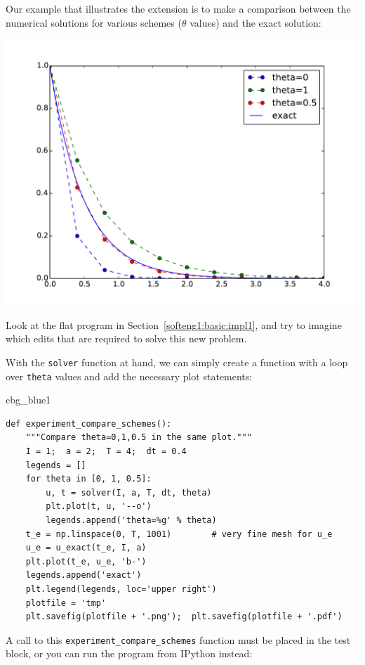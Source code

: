 \documentclass[%
oneside,                 %
final,                   %
10pt]{article}
\newenvironment{_cod_tight}[1]{
   \def\FrameCommand{\colorbox{#1}}
   \FrameRule0.6pt\MakeFramed {\FrameRestore}\vskip3mm}
   {\vskip0mm\endMakeFramed}
\newenvironment{cod}[1]{
\bgroup\rmfamily
\fboxsep=0mm\relax
\begin{_cod_tight}{#1}
\list{}{\parsep=-2mm\parskip=0mm\topsep=0pt\leftmargin=2mm
\rightmargin=2\leftmargin\leftmargin=4pt\relax}
\item\relax}
{\endlist\end{_cod_tight}\egroup}
\newenvironment{question_mdfboxadmon}[1][]{
\begin{question_mdfboxmdframed}[frametitle=#1]
}
{
\end{question_mdfboxmdframed}
}
\begin{document}
Our example that illustrates the extension
is to make a comparison between the numerical solutions
for various schemes ($\theta$ values) and the exact solution:



\centerline{\includegraphics[width=0.7\linewidth]{fig-softeng/compare.pdf}}




\begin{question_mdfboxadmon}
Look at the flat program in
Section~\ref{softeng1:basic:impl1},
and try to imagine which edits that are required to solve this new problem.
\end{question_mdfboxadmon}



With the \texttt{solver} function at hand, we can simply create a function
with a loop over \texttt{theta} values and add the necessary plot statements:

\begin{cod}{cbg_blue1}\begin{Verbatim}[numbers=none,fontsize=\fontsize{9pt}{9pt},baselinestretch=0.95,xleftmargin=2mm]
def experiment_compare_schemes():
    """Compare theta=0,1,0.5 in the same plot."""
    I = 1;  a = 2;  T = 4;  dt = 0.4
    legends = []
    for theta in [0, 1, 0.5]:
        u, t = solver(I, a, T, dt, theta)
        plt.plot(t, u, '--o')
        legends.append('theta=%g' % theta)
    t_e = np.linspace(0, T, 1001)        # very fine mesh for u_e
    u_e = u_exact(t_e, I, a)
    plt.plot(t_e, u_e, 'b-')
    legends.append('exact')
    plt.legend(legends, loc='upper right')
    plotfile = 'tmp'
    plt.savefig(plotfile + '.png');  plt.savefig(plotfile + '.pdf')
\end{Verbatim}
\end{cod}
\noindent

A call to this \Verb!experiment_compare_schemes! function must be placed
in the test block, or you can run the program from IPython instead:
\end{document}
